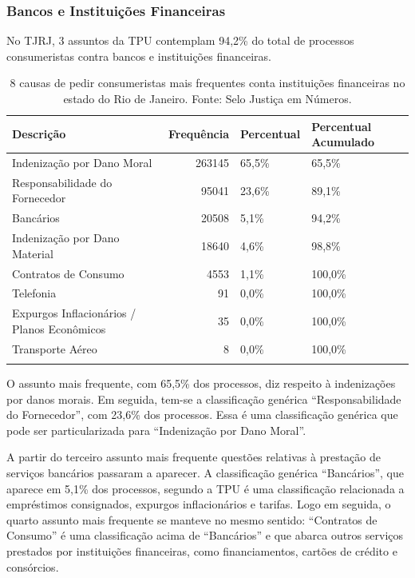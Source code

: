 \documentclass[]{report}
\begin{document}
\subsubsection{Bancos e Instituições
Financeiras}\label{bancos-e-instituicoes-financeiras-1}

No TJRJ, 3 assuntos da TPU contemplam 94,2\% do total de processos
consumeristas contra bancos e instituições financeiras.

\begin{longtable}{lrll}
\caption{8 causas de pedir consumeristas mais frequentes conta instituições financeiras no estado do Rio de Janeiro. Fonte: Selo Justiça em Números.} \\
  \hline
Descrição & Frequência & Percentual & Percentual Acumulado \\
  \hline
Indenização por Dano Moral & 263145 & 65,5\% & 65,5\% \\
  Responsabilidade do Fornecedor & 95041 & 23,6\% & 89,1\% \\
  Bancários & 20508 & 5,1\% & 94,2\% \\
  Indenização por Dano Material & 18640 & 4,6\% & 98,8\% \\
  Contratos de Consumo & 4553 & 1,1\% & 100,0\% \\
  Telefonia &  91 & 0,0\% & 100,0\% \\
  Expurgos Inflacionários / Planos Econômicos &  35 & 0,0\% & 100,0\% \\
  Transporte Aéreo &   8 & 0,0\% & 100,0\% \\
   \hline
\hline
\label{unnamed-chunk-22}
\end{longtable}

O assunto mais frequente, com 65,5\% dos processos, diz respeito à
indenizações por danos morais. Em seguida, tem-se a classificação
genérica ``Responsabilidade do Fornecedor'', com 23,6\% dos processos.
Essa é uma classificação genérica que pode ser particularizada para
``Indenização por Dano Moral''.

A partir do terceiro assunto mais frequente questões relativas à
prestação de serviços bancários passaram a aparecer. A classificação
genérica ``Bancários'', que aparece em 5,1\% dos processos, segundo a
TPU é uma classificação relacionada a empréstimos consignados, expurgos
inflacionários e tarifas. Logo em seguida, o quarto assunto mais
frequente se manteve no mesmo sentido: ``Contratos de Consumo'' é uma
classificação acima de ``Bancários'' e que abarca outros serviços
prestados por instituições financeiras, como financiamentos, cartões de
crédito e consórcios.
\end{document}
